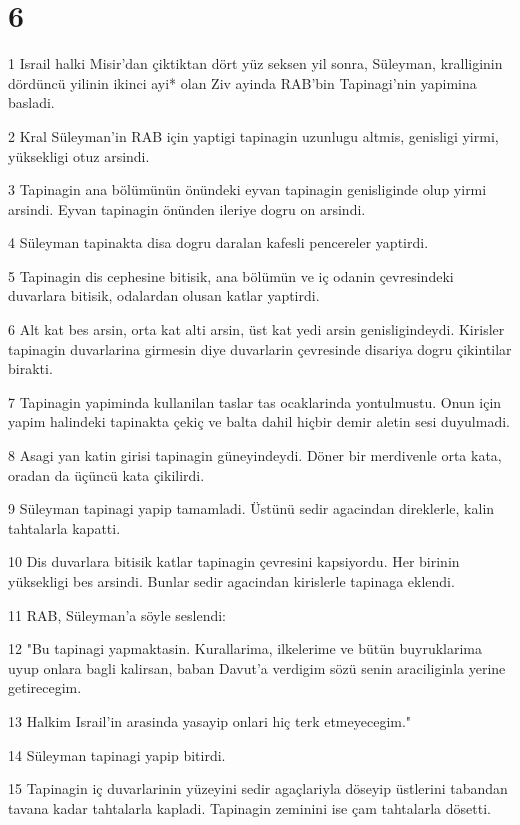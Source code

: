 \chapter{6}

\par 1 Israil halki Misir'dan çiktiktan dört yüz seksen yil sonra, Süleyman, kralliginin dördüncü yilinin ikinci ayi* olan Ziv ayinda RAB'bin Tapinagi'nin yapimina basladi.
\par 2 Kral Süleyman'in RAB için yaptigi tapinagin uzunlugu altmis, genisligi yirmi, yüksekligi otuz arsindi.
\par 3 Tapinagin ana bölümünün önündeki eyvan tapinagin genisliginde olup yirmi arsindi. Eyvan tapinagin önünden ileriye dogru on arsindi.
\par 4 Süleyman tapinakta disa dogru daralan kafesli pencereler yaptirdi.
\par 5 Tapinagin dis cephesine bitisik, ana bölümün ve iç odanin çevresindeki duvarlara bitisik, odalardan olusan katlar yaptirdi.
\par 6 Alt kat bes arsin, orta kat alti arsin, üst kat yedi arsin genisligindeydi. Kirisler tapinagin duvarlarina girmesin diye duvarlarin çevresinde disariya dogru çikintilar birakti.
\par 7 Tapinagin yapiminda kullanilan taslar tas ocaklarinda yontulmustu. Onun için yapim halindeki tapinakta çekiç ve balta dahil hiçbir demir aletin sesi duyulmadi.
\par 8 Asagi yan katin girisi tapinagin güneyindeydi. Döner bir merdivenle orta kata, oradan da üçüncü kata çikilirdi.
\par 9 Süleyman tapinagi yapip tamamladi. Üstünü sedir agacindan direklerle, kalin tahtalarla kapatti.
\par 10 Dis duvarlara bitisik katlar tapinagin çevresini kapsiyordu. Her birinin yüksekligi bes arsindi. Bunlar sedir agacindan kirislerle tapinaga eklendi.
\par 11 RAB, Süleyman'a söyle seslendi:
\par 12 "Bu tapinagi yapmaktasin. Kurallarima, ilkelerime ve bütün buyruklarima uyup onlara bagli kalirsan, baban Davut'a verdigim sözü senin araciliginla yerine getirecegim.
\par 13 Halkim Israil'in arasinda yasayip onlari hiç terk etmeyecegim."
\par 14 Süleyman tapinagi yapip bitirdi.
\par 15 Tapinagin iç duvarlarinin yüzeyini sedir agaçlariyla döseyip üstlerini tabandan tavana kadar tahtalarla kapladi. Tapinagin zeminini ise çam tahtalarla dösetti.
